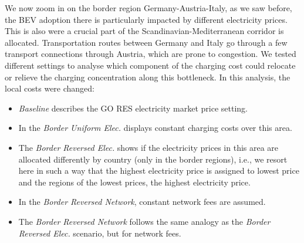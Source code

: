 \documentclass[preprint,10pt,review, authoryear]{elsarticle}
\begin{document}
    We now zoom in on the border region Germany-Austria-Italy, as we saw before, the BEV adoption there is particularly impacted by different electricity prices. This is also were a crucial part of the Scandinavian-Mediterranean corridor is allocated. Transportation routes between Germany and Italy go through a few transport connections through Austria, which are prone to congestion. We tested different settings to analyse which component of the charging cost could relocate or relieve the charging concentration along this bottleneck. In this analysis, the local costs were changed:
    \begin{itemize}
        \item \textit{Baseline} describes the GO RES electricity market price setting.
        \item In the \textit{Border Uniform Elec.} displays constant charging costs over this area.
        \item The \textit{Border Reversed Elec.} shows if the electricity prices in this area are allocated differently by country (only in the border regions), i.e., we resort here in such a way that the highest electricity price is assigned to lowest price and the regions of the lowest prices, the highest electricity price.
        \item In the \textit{Border Reversed Network}, constant network fees are assumed.
        \item The \textit{Border Reversed Network} follows the same analogy as the \textit{Border Reversed Elec.} scenario, but for network fees.
    \end{itemize}
\end{document}
